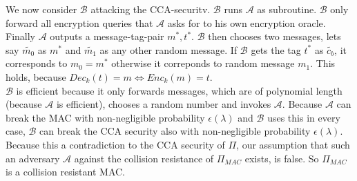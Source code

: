 



We now consider \(\mathcal{B}\) attacking the CCA-securitv. \(\mathcal{B}\) runs \(\mathcal{A}\) as subroutine. \(\mathcal{B}\) only forward all encryption queries that \(\mathcal{A}\) asks for to his own encryption oracle. Finally \(\mathcal{A}\) outputs a message-tag-pair \(m^*, t^*\). \(\mathcal{B}\) then chooses two messages, lets 
say $\widetilde{m_0}$ as $m^*$ and $\widetilde{m_1}$ as any other random message. If \(\mathcal{B}\) gets the tag $t^*$ as \(\widetilde{c_b}\), it corresponds to $m_0 = m^*$ otherwise it correponds to random message $m_1$. This holds, because \(Dec_k(t) = m \Leftrightarrow Enc_k(m) = t\).\\
\(\mathcal{B}\) is efficient because it only forwards messages, which are of polynomial length (because \(\mathcal{A}\) is efficient), chooses a random number and invokes \(\mathcal{A}\). 
Because \(\mathcal{A}\) can break the MAC with non-negligible probability $\epsilon(\lambda)$ and \(\mathcal{B}\) uses this in every case, \(\mathcal{B}\) can break the CCA security also with non-negligible probability $\epsilon(\lambda)$. 
%
%
Because this a contradiction to the CCA security of \(\Pi\), our assumption that such an adversary \(\mathcal{A}\) against the collision resistance of \(\Pi_{MAC}\) exists, is false. 
So \(\Pi_{MAC}\) is a collision resistant MAC.
